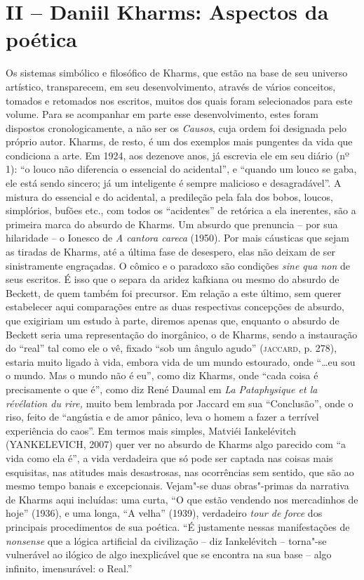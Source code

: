 \section{II -- Daniil Kharms: Aspectos da poética}

Os sistemas simbólico e filosófico de Kharms, que estão na base de seu
universo artístico, transparecem, em seu desenvolvimento, através de
vários conceitos, tomados e retomados nos escritos, muitos dos quais
foram selecionados para este volume. Para se acompanhar em parte esse
desenvolvimento, estes foram dispostos cronologicamente, a não ser os
\emph{Causos}, cuja ordem foi designada pelo próprio autor. Kharms, de
resto, é um dos exemplos mais pungentes da vida que condiciona a arte.
Em 1924, aos dezenove anos, já escrevia ele em seu diário (nº 1): ``o
louco não diferencia o essencial do acidental'', e ``quando um louco se
gaba, ele está sendo sincero; já um inteligente é sempre malicioso e
desagradável''. A mistura do essencial e do acidental, a predileção pela
fala dos bobos, loucos, simplórios, bufões etc., com todos os
``acidentes'' de retórica a ela inerentes, são a primeira marca do
absurdo de Kharms. Um absurdo que prenuncia -- por sua hilaridade -- o
Ionesco de \emph{A cantora careca} (1950). Por mais cáusticas que sejam
as tiradas de Kharms, até a última fase de desespero, elas não deixam de
ser sinistramente engraçadas. O cômico e o paradoxo são condições
\emph{sine qua non} de seus escritos. É isso que o separa da aridez
kafkiana ou mesmo do absurdo de Beckett, de quem também foi precursor.
Em relação a este último, sem querer estabelecer aqui comparações entre
as duas respectivas concepções de absurdo, que exigiriam um estudo à
parte, diremos apenas que, enquanto o absurdo de Beckett seria uma
representação do inorgânico, o de Kharms, sendo a instauração do
``real'' tal como ele o vê, fixado ``sob um ângulo agudo''
(\textsc{jaccard}, p. 278), estaria muito ligado à vida, embora vida de
um mundo estourado, onde ``\ldots{}eu sou o mundo. Mas o mundo não é eu'',
como diz Kharms, onde ``cada coisa é precisamente o que é'', como diz
René Daumal em \emph{La Pataphysique et la révélation du rire,} muito
bem lembrada por Jaccard em sua ``Conclusão'', onde o riso, feito de
``angústia e de amor pânico, leva o homem a fazer a terrível experiência
do caos''. Em termos mais simples, Matviéi Iankelévitch (YANKELEVICH,
2007) quer ver no absurdo de Kharms algo parecido com ``a vida como ela
é'', a vida verdadeira que só pode ser captada nas coisas mais
esquisitas, nas atitudes mais desastrosas, nas ocorrências sem sentido,
que são ao mesmo tempo banais e excepcionais. Vejam"-se duas obras"-primas
da narrativa de Kharms aqui incluídas: uma curta, ``O que estão vendendo
nos mercadinhos de hoje'' (1936), e uma longa, ``A velha'' (1939),
verdadeiro \emph{tour de force} dos principais procedimentos de sua
poética. ``É justamente nessas manifestações de \emph{nonsense} que a
lógica artificial da civilização -- diz Iankelévitch -- torna"-se
vulnerável ao ilógico de algo inexplicável que se encontra na sua base
-- algo infinito, imensurável: o Real.''

